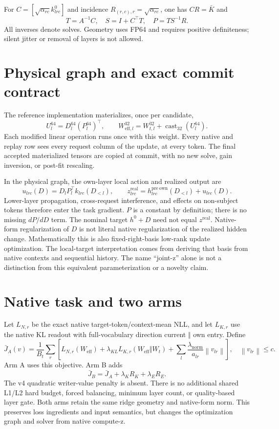 \documentclass[11pt]{article}
\newcommand{\norm}[1]{\left\lVert#1\right\rVert}
\begin{document}
For $C=[\sqrt{\alpha_{rc}}k^0_{lrc}]$ and incidence
$R_{(r,c),r}=\sqrt{\alpha_{rc}}$, one has $CR=\bar K$ and
\[
T=A^{-1}C,\quad S=I+C^\top T,\quad P=T S^{-1}R.
\]
All inverses denote solves. Geometry uses FP64 and requires positive
definiteness; silent jitter or removal of layers is not allowed.

\section{Physical graph and exact commit contract}
The reference implementation materializes, once per candidate,
\[
U_l^{64}=D_l^{64}(P_l^{64})^\top,\qquad
W_{\mathrm{eff},l}^{32}=W_{t,l}^{32}+\operatorname{cast}_{32}(U_l^{64}).
\]
Each modified linear operation runs once with this weight. Every native
and replay row sees every request column of the update, at every token.
The final accepted materialized tensors are copied at commit, with no
new solve, gain inversion, or post-fit rescaling.

In the physical graph, the own-layer local action and realized output are
\[
u_{lrc}(D)=D_lP_l^\top k_{lrc}(D_{<l}),\qquad
z^{\mathrm{real}}_{lrc}=h^{\mathrm{pre\ own}}_{lrc}(D_{<l})+u_{lrc}(D).
\]
Lower-layer propagation, cross-request interference, and effects on
non-subject tokens therefore enter the task gradient. $P$ is a constant
by definition; there is no missing $dP/dD$ term. The nominal target
$h^0+D$ need not equal $z^{\mathrm{real}}$. Native-form regularization of
$D$ is not literal native regularization of the realized hidden change.
Mathematically this is also fixed-right-basis low-rank update optimization.
The local-target interpretation comes from deriving that basis from
native contexts and sequential history. The name ``joint-z'' alone is
not a distinction from this equivalent parameterization or a novelty claim.

\section{Native task and two arms}
Let $L_{N,r}$ be the exact native target-token/context-mean NLL, and let
$L_{K,r}$ use the native KL readout with full-vocabulary direction
current $\Vert$ own entry. Define
\[
\bar J_A(v)=\frac1{B_t}\sum_r\left[
L_{N,r}(W_{\mathrm{eff}})+\lambda_{KL}L_{K,r}(W_{\mathrm{eff}}\Vert W_t)
+\sum_l\frac{\lambda_{\mathrm{norm}}}{a_{lr}}\norm{v_{lr}}\right],
\quad\norm{v_{lr}}\le c.
\]
Arm A uses this objective. Arm B adds
\[
\bar J_B=\bar J_A+\lambda_K R_K+\lambda_E R_E.
\]
The v4 quadratic writer-value penalty is absent. There is no additional
shared L1/L2 hard budget, forced balancing, minimum layer count, or
quality-based layer gate. Both arms retain the same ridge geometry and
native-form norm. This preserves loss ingredients and input semantics,
but changes the optimization graph and solver from native compute-z.
\end{document}

